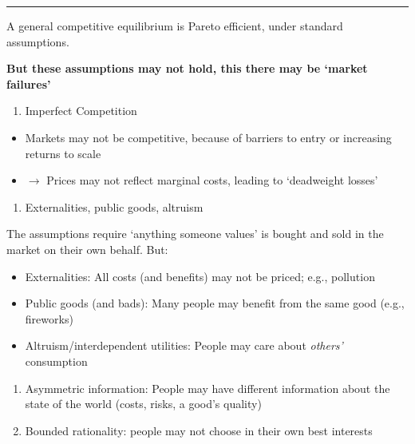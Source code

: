 \documentclass[]{article}
\providecommand{\tightlist}{%
  \setlength{\itemsep}{0pt}\setlength{\parskip}{0pt}}
\begin{document}
\begin{center}\rule{0.5\linewidth}{\linethickness}\end{center}

\begin{description}
\tightlist
\item[First fundamental theorem of welfare economics]
A general competitive equilibrium is Pareto efficient, under standard
assumptions.
\end{description}

\bigskip

\textbf{But these assumptions may not hold, this there may be `market
failures'}

\begin{enumerate}
\def\labelenumi{\arabic{enumi}.}
\tightlist
\item
  Imperfect Competition
\end{enumerate}

\begin{itemize}
\tightlist
\item
  Markets may not be competitive, because of barriers to entry or
  increasing returns to scale
\item
  \(\rightarrow\) Prices may not reflect marginal costs, leading to
  `deadweight losses'
\end{itemize}

\bigskip

\begin{enumerate}
\def\labelenumi{\arabic{enumi}.}
\setcounter{enumi}{1}
\tightlist
\item
  Externalities, public goods, altruism
\end{enumerate}

The assumptions require `anything someone values' is bought and sold in
the market on their own behalf. But:

\begin{itemize}
\tightlist
\item
  Externalities: All costs (and benefits) may not be priced; e.g.,
  pollution
\item
  Public goods (and bads): Many people may benefit from the same good
  (e.g., fireworks)
\item
  Altruism/interdependent utilities: People may care about
  \emph{others'} consumption
\end{itemize}

\bigskip

\begin{enumerate}
\def\labelenumi{\arabic{enumi}.}
\setcounter{enumi}{2}
\item
  Asymmetric information: People may have different information about
  the state of the world (costs, risks, a good's quality)
\item
  Bounded rationality: people may not choose in their own best interests
\end{enumerate}
\end{document}
